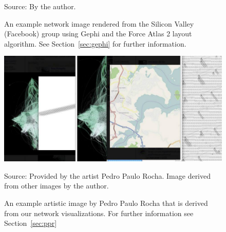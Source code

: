 \begin{apendicesenv}
\begin{figure}[!tbp]
	\centering
	\caption{An example network image rendered from the Silicon Valley (Facebook) group using Gephi and the Force Atlas 2 layout algorithm.
	See Section~\ref{sec:gephi} for further information.}\label{fig:gephi}
\begin{flushleft}\footnotesize
Source: By the author.\
\end{flushleft}
\end{figure}

\begin{figure}[h!]
\begin{center}
\includegraphics[scale=.45]{figs/ppr}
\caption{An example artistic image by Pedro Paulo Rocha that is derived from our network visualizations.
	For further information see Section~\ref{sec:ppr}}
\label{fig:ppr}
\begin{flushleft}\footnotesize
Source: Provided by the artist Pedro Paulo Rocha. Image derived from other images by the author.\
\end{flushleft}
\end{center}
\end{figure}
        \FloatBarrier

\end{apendicesenv}
